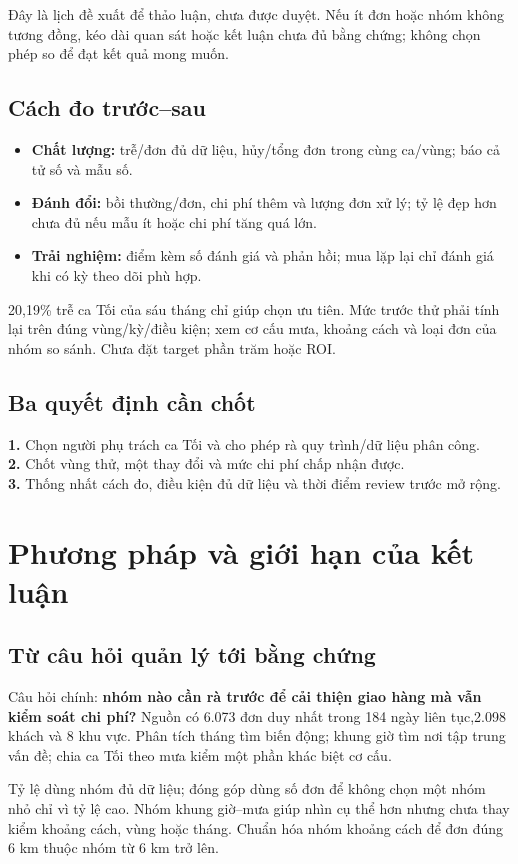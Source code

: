 \documentclass[11pt,a4paper]{article}
\begin{document}
Đây là lịch đề xuất để thảo luận, chưa được duyệt. Nếu ít đơn hoặc nhóm không tương đồng, kéo dài quan sát hoặc kết luận chưa đủ bằng chứng; không chọn phép so để đạt kết quả mong muốn.

\subsection{Cách đo trước–sau}
\begin{itemize}
\item \textbf{Chất lượng:} trễ/đơn đủ dữ liệu, hủy/tổng đơn trong cùng ca/vùng; báo cả tử số và mẫu số.
\item \textbf{Đánh đổi:} bồi thường/đơn, chi phí thêm và lượng đơn xử lý; tỷ lệ đẹp hơn chưa đủ nếu mẫu ít hoặc chi phí tăng quá lớn.
\item \textbf{Trải nghiệm:} điểm kèm số đánh giá và phản hồi; mua lặp lại chỉ đánh giá khi có kỳ theo dõi phù hợp.
\end{itemize}
20,19\% trễ ca Tối của sáu tháng chỉ giúp chọn ưu tiên. Mức trước thử phải tính lại trên đúng vùng/kỳ/điều kiện; xem cơ cấu mưa, khoảng cách và loại đơn của nhóm so sánh. Chưa đặt target phần trăm hoặc ROI.

\subsection{Ba quyết định cần chốt}
\textbf{1.} Chọn người phụ trách ca Tối và cho phép rà quy trình/dữ liệu phân công.\\
\textbf{2.} Chốt vùng thử, một thay đổi và mức chi phí chấp nhận được.\\
\textbf{3.} Thống nhất cách đo, điều kiện đủ dữ liệu và thời điểm review trước mở rộng.

\newpage
\section{Phương pháp và giới hạn của kết luận}
\subsection{Từ câu hỏi quản lý tới bằng chứng}
Câu hỏi chính: \textbf{nhóm nào cần rà trước để cải thiện giao hàng mà vẫn kiểm soát chi phí?} Nguồn có 6.073 đơn duy nhất trong 184 ngày liên tục,2.098 khách và 8 khu vực. Phân tích tháng tìm biến động; khung giờ tìm nơi tập trung vấn đề; chia ca Tối theo mưa kiểm một phần khác biệt cơ cấu.

Tỷ lệ dùng nhóm đủ dữ liệu; đóng góp dùng số đơn để không chọn một nhóm nhỏ chỉ vì tỷ lệ cao. Nhóm khung giờ–mưa giúp nhìn cụ thể hơn nhưng chưa thay kiểm khoảng cách, vùng hoặc tháng. Chuẩn hóa nhóm khoảng cách để đơn đúng 6 km thuộc nhóm từ 6 km trở lên.
\end{document}
